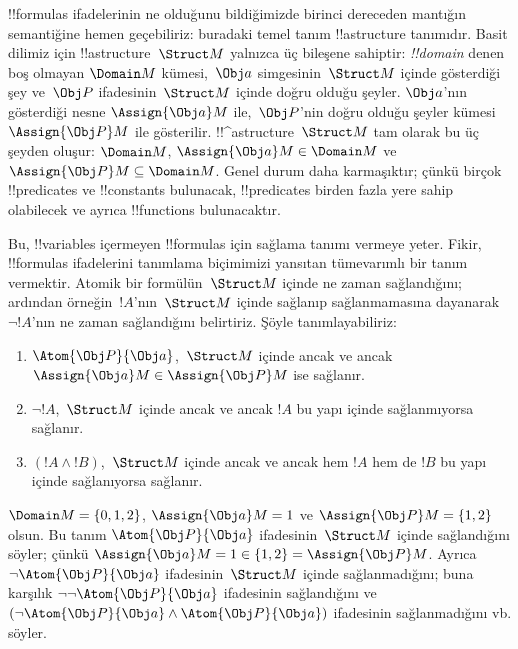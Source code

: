 



!!{formula}s ifadelerinin ne olduğunu bildiğimizde birinci dereceden
mantığın semantiğine hemen geçebiliriz: buradaki temel tanım
!!a{structure} tanımıdır. Basit dilimiz için !!a{structure}~$\Struct M$
yalnızca üç bileşene sahiptir: \emph{!!{domain}} denen boş olmayan
$\Domain M$ kümesi,~$\Obj a$ simgesinin~$\Struct M$ içinde gösterdiği
şey ve~$\Obj P$ ifadesinin~$\Struct M$ içinde doğru olduğu şeyler.
$\Obj a$'nın gösterdiği nesne $\Assign{\Obj a}M$ ile,~$\Obj P$'nin
doğru olduğu şeyler kümesi $\Assign{\Obj P}M$ ile gösterilir.
!!^a{structure}~$\Struct M$ tam olarak bu üç şeyden oluşur:
$\Domain M$, $\Assign{\Obj a}M\in\Domain M$ ve
$\Assign{\Obj P}M\subseteq\Domain M$. Genel durum daha karmaşıktır;
çünkü birçok !!{predicate}s ve !!{constant}s bulunacak, !!{predicate}s
birden fazla yere sahip olabilecek ve ayrıca !!{function}s bulunacaktır.

Bu, !!{variable}s içermeyen !!{formula}s için sağlama tanımı vermeye
yeter. Fikir, !!{formula}s ifadelerini tanımlama biçimimizi yansıtan
tümevarımlı bir tanım vermektir. Atomik bir formülün~$\Struct M$
içinde ne zaman sağlandığını; ardından örneğin~$!A$'nın~$\Struct M$
içinde sağlanıp sağlanmamasına dayanarak $\lnot !A$'nın ne zaman
sağlandığını belirtiriz. Şöyle tanımlayabiliriz:
\begin{enumerate}
  \item $\Atom{\Obj P}{\Obj a}$,~$\Struct M$ içinde ancak ve ancak
  $\Assign{\Obj a}M\in\Assign{\Obj P}M$ ise sağlanır.
  \item $\lnot !A$,~$\Struct M$ içinde ancak ve ancak $!A$ bu yapı
  içinde sağlanmıyorsa sağlanır.
  \item $(!A\land !B)$,~$\Struct M$ içinde ancak ve ancak hem $!A$
  hem de $!B$ bu yapı içinde sağlanıyorsa sağlanır.
\end{enumerate}
$\Domain M=\{0,1,2\}$, $\Assign{\Obj a}M=1$ ve
$\Assign{\Obj P}M=\{1,2\}$ olsun. Bu tanım
$\Atom{\Obj P}{\Obj a}$ ifadesinin~$\Struct M$ içinde sağlandığını
söyler; çünkü $\Assign{\Obj a}M=1\in\{1,2\}=\Assign{\Obj P}M$.
Ayrıca $\lnot\Atom{\Obj P}{\Obj a}$ ifadesinin~$\Struct M$ içinde
sağlanmadığını; buna karşılık $\lnot\lnot\Atom{\Obj P}{\Obj a}$
ifadesinin sağlandığını ve
$(\lnot\Atom{\Obj P}{\Obj a}\land\Atom{\Obj P}{\Obj a})$ ifadesinin
sağlanmadığını vb. söyler.

